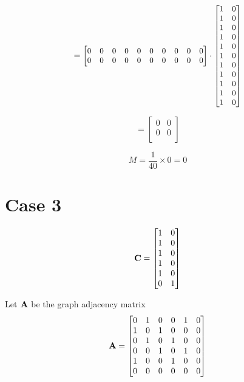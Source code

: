 \documentclass[a4paper,12pt]{article}
\begin{document}
	\[\small =\begin{bmatrix}
		0&  0&  0&  0&  0& 0& 0& 0& 0& 0 \\
		0& 0& 0& 0& 0& 0& 0& 0& 0&  0 \\
	\end{bmatrix} \cdot 
	\begin{bmatrix}
		1 & 0 \\ 
		1 & 0 \\
		1 & 0 \\
		1 & 0 \\ 
		1 & 0 \\ 
		1 & 0 \\ 
		1 & 0 \\ 
		1 & 0 \\ 
		1 & 0 \\ 
		1 & 0 \\ 
		1 & 0 
	\end{bmatrix}\]
	
	
	\[ =\begin{bmatrix}
		0 & 0 \\
		0 & 0 \\
	\end{bmatrix} \]
	
	\[M = \frac{1}{40} \times 0 = 0\]
	
	
	\section{Case 3}
	\[ {\bf C} = \begin{bmatrix}1 & 0 \\ 1 & 0 \\ 1 & 0 \\ 1 & 0 \\ 1 & 0 \\ 0 & 1 \\	\end{bmatrix}\] 
	
	Let $\bf A$ be the graph adjacency matrix
	\[ {\bf A} = \begin{bmatrix}
		0& 1& 0& 0& 1& 0 \\
		1& 0& 1& 0& 0& 0 \\
		0& 1& 0& 1& 0& 0 \\
		0& 0& 1& 0& 1& 0 \\
		1& 0& 0& 1& 0& 0 \\
		0& 0& 0& 0& 0& 0 \\
	\end{bmatrix}\] 
	
	
	
	
	
	
	
	
	
	
	
	
	
	
	
	
	
	
	\clearpage
	\newpage
	
	
	
	
	
	
	
	
	
\end{document}
